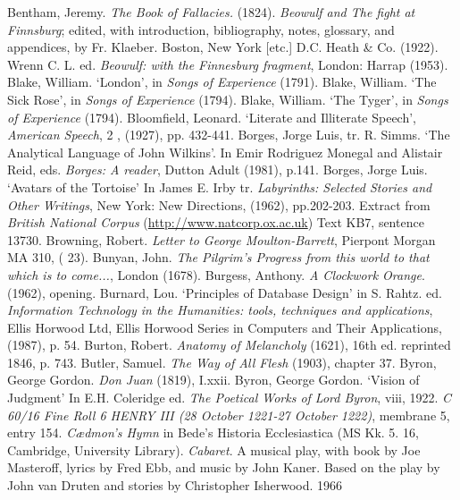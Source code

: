 \begin{bibitemlist}{1}
 Bentham, Jeremy. \textit{The Book of Fallacies.} (1824).
 \textit{Beowulf and The fight at Finnsburg}; edited, with introduction, bibliography, notes, glossary, and appendices, by Fr. Klaeber. Boston, New York [etc.]  D.C. Heath \& Co. (1922).
 Wrenn C. L. ed. \textit{Beowulf: with the Finnesburg fragment}, London: Harrap (1953).
 Blake, William. ‘London’, in \textit{Songs of Experience} (1791).
 Blake, William. ‘The Sick Rose’, in \textit{Songs of Experience} (1794).
 Blake, William. ‘The Tyger’, in \textit{Songs of Experience} (1794).
 Bloomfield, Leonard. ‘Literate and Illiterate Speech’, \textit{American Speech}, 2 , (1927), pp. 432-441.
 Borges, Jorge Luis, tr. R. Simms. ‘The Analytical Language of John Wilkins’. In Emir Rodriguez Monegal and Alistair Reid, eds. \textit{Borges: A reader}, Dutton Adult (1981), p.141.
 Borges, Jorge Luis. ‘Avatars of the Tortoise’ In James E. Irby tr. \textit{Labyrinths: Selected Stories and Other Writings}, New York: New Directions, (1962), pp.202-203.
 Extract from \textit{British National Corpus} (\url{http://www.natcorp.ox.ac.uk}) Text KB7, sentence 13730.
 Browning, Robert. \textit{Letter to George Moulton-Barrett}, Pierpont Morgan MA 310, (\cite{KLINKENBORG} 23).
 Bunyan, John. \textit{The Pilgrim's Progress from this world to that which is to come...}, London (1678).
 Burgess, Anthony. \textit{A Clockwork Orange}. (1962), opening.
 Burnard, Lou. ‘Principles of Database Design’ in S. Rahtz. ed. \textit{Information Technology in the Humanities: tools, techniques and applications}, Ellis Horwood Ltd, Ellis Horwood Series in Computers and Their Applications, (1987), p. 54.
 Burton, Robert. \textit{Anatomy of Melancholy} (1621), 16th ed. reprinted 1846, p. 743.
 Butler, Samuel. \textit{The Way of All Flesh} (1903), chapter 37.
 Byron, George Gordon. \textit{Don Juan} (1819), I.xxii.
 Byron, George Gordon. ‘Vision of Judgment’ In E.H. Coleridge ed. \textit{The Poetical Works of Lord Byron}, viii, 1922.
 \textit{C 60/16 Fine Roll 6 HENRY III (28 October 1221-27 October 1222)}, membrane 5, entry 154.
 \textit{Cædmon's Hymn} in Bede's Historia Ecclesiastica (MS Kk. 5. 16, Cambridge, University Library).
 \textit{Cabaret}. A musical play, with book by Joe Masteroff, lyrics by Fred Ebb, and music by John Kaner. Based on the play by John van Druten and stories by Christopher Isherwood. 1966

\end{bibitemlist}
